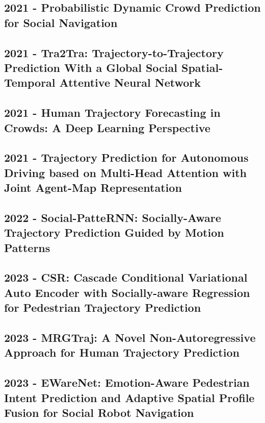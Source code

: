 \cite{cui2021learning}

\subsection*{2021 - Probabilistic Dynamic Crowd Prediction for Social Navigation}

\cite{kiss2021probabilistic}

\subsection*{2021 - Tra2Tra: Trajectory-to-Trajectory Prediction With a Global Social Spatial-Temporal Attentive Neural Network}

\cite{xu2021tra2tra}

\subsection*{2021 - Human Trajectory Forecasting in Crowds: A Deep Learning Perspective}

\cite{kothari2021human}

\subsection*{2021 - Trajectory Prediction for Autonomous Driving based on Multi-Head Attention with Joint Agent-Map Representation}

\cite{messaoud2021trajectory}

\subsection*{2022 - Social-PatteRNN: Socially-Aware Trajectory Prediction Guided by Motion Patterns}

\cite{navarro2022social}

\subsection*{2023 - CSR: Cascade Conditional Variational Auto Encoder with Socially-aware Regression for Pedestrian Trajectory Prediction}

\cite{zhou2023csr}

\subsection*{2023 - MRGTraj: A Novel Non-Autoregressive Approach for Human Trajectory Prediction}

\cite{peng2023mrgtraj}

\subsection*{2023 - EWareNet: Emotion-Aware Pedestrian Intent Prediction and Adaptive Spatial Profile Fusion for Social Robot Navigation}

\cite{narayanan2023ewarenet}
